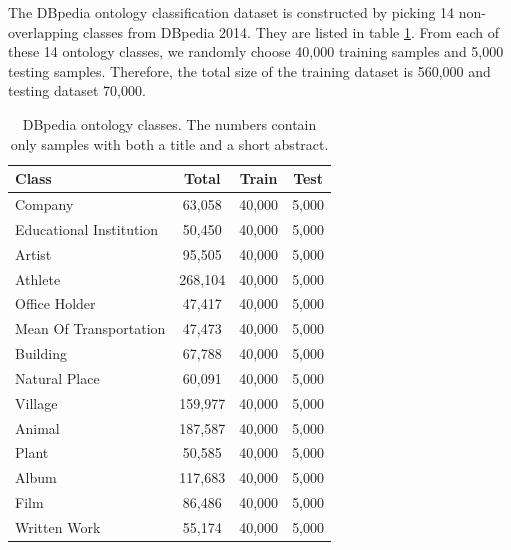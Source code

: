 \documentclass{article}
\begin{document}
\begin{CJK}{UTF8}{gbsn}
The DBpedia ontology classification dataset is constructed by picking 14 non-overlapping classes from DBpedia 2014. They are listed in table \ref{tab:dbpd}. From each of these 14 ontology classes, we randomly choose 40,000 training samples and 5,000 testing samples. Therefore, the total size of the training dataset is 560,000 and testing dataset 70,000. %


\begin{table}[ht]
  \caption{DBpedia ontology classes. The numbers contain only samples with both a title and a short abstract.}
  \label{tab:dbpd}
  \begin{center}
    \begin{tabular}{lccc}
      \hline
      \abovespace\belowspace
      Class & Total & Train & Test  \\
      \hline
      \abovespace
      Company & 63,058 & 40,000 & 5,000 \\
      Educational Institution & 50,450 & 40,000 & 5,000 \\
      Artist & 95,505 & 40,000 & 5,000 \\
      Athlete & 268,104 & 40,000 & 5,000 \\
      Office Holder & 47,417 & 40,000 & 5,000 \\
      Mean Of Transportation & 47,473 & 40,000 & 5,000 \\
      Building & 67,788 & 40,000 & 5,000 \\
      Natural Place & 60,091 & 40,000 & 5,000 \\
      Village & 159,977 & 40,000 & 5,000 \\
      Animal & 187,587 & 40,000 & 5,000 \\
      Plant & 50,585 & 40,000 & 5,000 \\
      Album & 117,683 & 40,000 & 5,000 \\
      Film & 86,486 & 40,000 & 5,000 \\
      \belowspace
      Written Work & 55,174 & 40,000 & 5,000 \\
      \hline
    \end{tabular}
  \end{center}
\end{table}


\end{CJK}
\end{document}
